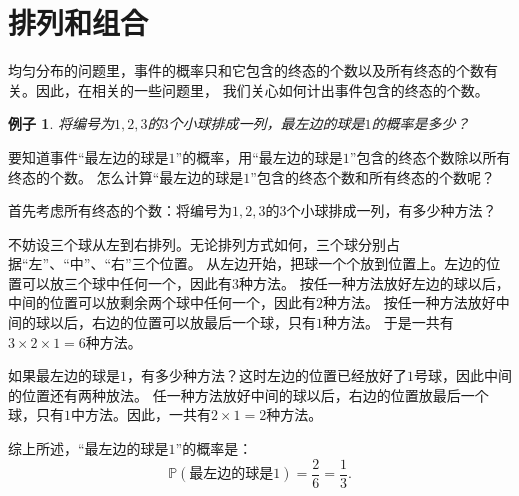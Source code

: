 \documentclass[12pt,UTF8]{ctexbook}
\newtheorem{ex}{例子}[section]
\begin{document}


\section{排列和组合}
均匀分布的问题里，事件的概率只和它包含的终态的个数以及所有终态的个数有关。因此，在相关的一些问题里，
我们关心如何计出事件包含的终态的个数。

\begin{ex}
    将编号为$1,2,3$的$3$个小球排成一列，最左边的球是$1$的概率是多少？
\end{ex}
要知道事件“最左边的球是$1$”的概率，用“最左边的球是$1$”包含的终态个数除以所有终态的个数。
怎么计算“最左边的球是$1$”包含的终态个数和所有终态的个数呢？

首先考虑所有终态的个数：将编号为$1,2,3$的$3$个小球排成一列，有多少种方法？

不妨设三个球从左到右排列。无论排列方式如何，三个球分别占据“左”、“中”、“右”三个位置。
从左边开始，把球一个个放到位置上。左边的位置可以放三个球中任何一个，因此有$3$种方法。
按任一种方法放好左边的球以后，中间的位置可以放剩余两个球中任何一个，因此有$2$种方法。
按任一种方法放好中间的球以后，右边的位置可以放最后一个球，只有$1$种方法。
于是一共有$3\times 2\times 1 = 6$种方法。

如果最左边的球是$1$，有多少种方法？这时左边的位置已经放好了$1$号球，因此中间的位置还有两种放法。
任一种方法放好中间的球以后，右边的位置放最后一个球，只有$1$中方法。因此，一共有$2\times 1 = 2$种方法。

综上所述，“最左边的球是$1$”的概率是：
$$ \mathbb{P}(\mbox{最左边的球是}1) = \frac{2}{6} = \frac{1}{3}. $$
\end{document}
